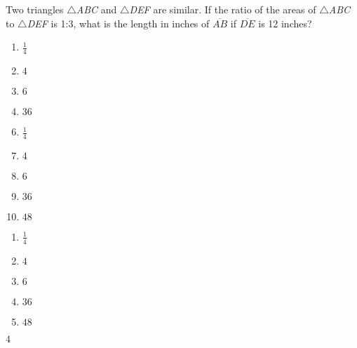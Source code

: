 Two triangles $\bigtriangleup$\textit{ABC} and $\bigtriangleup$\textit{DEF} are similar. If the ratio of the areas of $\bigtriangleup$\textit{ABC} to $\bigtriangleup$\textit{DEF} is 1:3, what is the length in inches of $\overline{AB}$ if $\overline{DE}$ is 12 inches?

\ifsat
	\begin{enumerate}[label=\Alph*)]
		\item   $\frac{1}{4}$
		\item  $4$ %
		\item  $6$ 
		\item  $36$ 
	\end{enumerate}
\else
\fi

\ifacteven
	\begin{enumerate}[label=\textbf{\Alph*.},itemsep=\fill,align=left]
		\setcounter{enumii}{5}
		\item   $\frac{1}{4}$
		\item  $4$ %
		\item  $6$ 
		\addtocounter{enumii}{1}
		\item  $36$ 
		\item  $48$ 
	\end{enumerate}
\else
\fi

\ifactodd
	\begin{enumerate}[label=\textbf{\Alph*.},itemsep=\fill,align=left]
		\item   $\frac{1}{4}$
		\item  $4$ %
		\item  $6$ 
		\item  $36$ 
		\item  $48$ 
	\end{enumerate}
\else
\fi

\ifgridin
  $4$ %
		
\else
\fi

